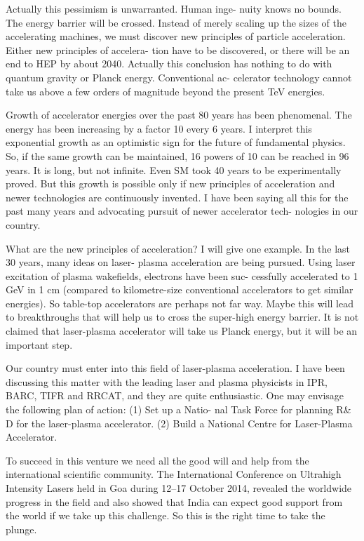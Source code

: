 Actually this pessimism is unwarranted. Human inge-
nuity knows no bounds. The energy barrier will be
crossed. Instead of merely scaling up the sizes of the
accelerating machines, we must discover new principles
of particle acceleration. Either new principles of accelera-
tion have to be discovered, or there will be an end to HEP
by about 2040. Actually this conclusion has nothing to do
with quantum gravity or Planck energy. Conventional ac-
celerator technology cannot take us above a few orders of
magnitude beyond the present TeV energies.

Growth of accelerator energies over the past 80 years
has been phenomenal. The energy has been increasing by
a factor 10 every 6 years. I interpret this exponential
growth as an optimistic sign for the future of fundamental
physics. So, if the same growth can be maintained, 16
powers of 10 can be reached in 96 years. It is long, but
not infinite. Even SM took 40 years to be experimentally
proved. But this growth is possible only if new principles
of acceleration and newer technologies are continuously
invented. I have been saying all this for the past many
years and advocating pursuit of newer accelerator tech-
nologies in our country.

What are the new principles of acceleration? I will give
one example. In the last 30 years, many ideas on laser-
plasma acceleration are being pursued. Using laser
excitation of plasma wakefields, electrons have been suc-
cessfully accelerated to 1 GeV in 1 cm (compared to
kilometre-size conventional accelerators to get similar
energies). So table-top accelerators are perhaps not far
way. Maybe this will lead to breakthroughs that will help
us to cross the super-high energy barrier. It is not claimed
that laser-plasma accelerator will take us Planck energy,
but it will be an important step.

Our country must enter into this field of laser-plasma
acceleration. I have been discussing this matter with the
leading laser and plasma physicists in IPR, BARC, TIFR
and RRCAT, and they are quite enthusiastic. One may
envisage the following plan of action: (1) Set up a Natio-
nal Task Force for planning R\& D for the laser-plasma
accelerator. (2) Build a National Centre for Laser-Plasma
Accelerator.

To succeed in this venture we need all the good will
and help from the international scientific community. The
International Conference on Ultrahigh Intensity Lasers
held in Goa during 12–17 October 2014, revealed the
worldwide progress in the field and also showed that
India can expect good support from the world if we take
up this challenge. So this is the right time to take the
plunge.

